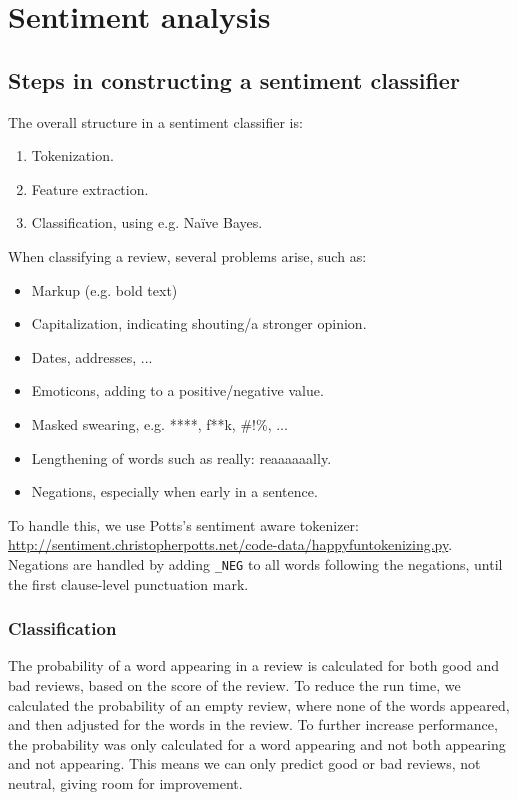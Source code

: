\section{Sentiment analysis}

\subsection{Steps in constructing a sentiment classifier}
The overall structure in a sentiment classifier is:
\begin{enumerate}
    \item Tokenization.
    \item Feature extraction.
    \item Classification, using e.g. Naïve Bayes.
\end{enumerate}
%
When classifying a review, several problems arise, such as:
\begin{itemize}
    \item Markup (e.g. bold text)
    \item Capitalization, indicating shouting/a stronger opinion.
    \item Dates, addresses, ...
    \item Emoticons, adding to a positive/negative value.
    \item Masked swearing, e.g. ****, f**k, \@\#!\%, ...
    \item Lengthening of words such as really: reaaaaaally.
    \item Negations, especially when early in a sentence.
\end{itemize}

To handle this, we use Potts's sentiment aware tokenizer: \url{http://sentiment.christopherpotts.net/code-data/happyfuntokenizing.py}. Negations are handled by adding \texttt{\_NEG} to all words following the negations, until the first clause-level punctuation mark.

\subsubsection{Classification}
The probability of a word appearing in a review is calculated for both good and bad reviews, based on the score of the review. To reduce the run time, we calculated the probability of an empty review, where none of the words appeared, and then adjusted for the words in the review. To further increase performance, the probability was only calculated for a word appearing and not both appearing and not appearing. This means we can only predict good or bad reviews, not neutral, giving room for improvement.


